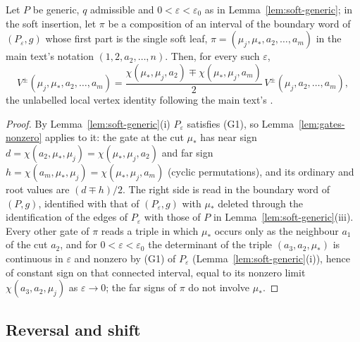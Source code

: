 \begin{lemma}\label{lem:softvertex}
Let $P$ be generic, $q$ admissible and $0<\varepsilon<\varepsilon_0$ as in
Lemma~\ref{lem:soft-generic}; in the soft insertion, let $\pi$ be a
composition of an interval of the boundary word of $(P_\varepsilon,g)$ whose
first part is the single soft leaf, $\pi=(\mu_j,\mu_*,a_2,\ldots,a_m)$ in the
main text's notation $(1,2,a_2,\ldots,n)$. Then, for every such $\varepsilon$,
\[
V^\pm(\mu_j,\mu_*,a_2,\ldots,a_m)=
\frac{\chi(\mu_*,\mu_j,a_2)\mp\chi(\mu_*,\mu_j,a_m)}{2}\,
V^\pm(\mu_j,a_2,\ldots,a_m),
\]
the unlabelled local vertex identity following the main text's
. 
\end{lemma}
\begin{proof}
By Lemma~\ref{lem:soft-generic}(i) $P_\varepsilon$ satisfies (G1), so
Lemma~\ref{lem:gates-nonzero} applies to it: the gate at the cut $\mu_*$ has
near sign $d=\chi(a_2,\mu_*,\mu_j)=\chi(\mu_*,\mu_j,a_2)$ and far sign
$h=\chi(a_m,\mu_*,\mu_j)=\chi(\mu_*,\mu_j,a_m)$ (cyclic permutations), and its
ordinary and root values are $(d\mp h)/2$. The right side is read in the
boundary word of $(P,g)$, identified with that of $(P_\varepsilon,g)$ with
$\mu_*$ deleted through the identification of the edges of $P_\varepsilon$
with those of $P$ in Lemma~\ref{lem:soft-generic}(iii). Every other gate of
$\pi$ reads a triple in which $\mu_*$ occurs only as the neighbour $a_1$ of
the cut $a_2$, and for $0<\varepsilon<\varepsilon_0$ the determinant of the
triple $(a_3,a_2,\mu_*)$ is continuous in $\varepsilon$ and nonzero by (G1)
of $P_\varepsilon$ (Lemma~\ref{lem:soft-generic}(i)), hence of constant sign
on that connected interval, equal to its nonzero limit $\chi(a_3,a_2,\mu_j)$
as $\varepsilon\to0$; the far signs of $\pi$ do not involve $\mu_*$.
\end{proof}

\subsection{Reversal and shift}

